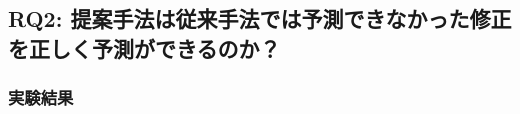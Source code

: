 \documentclass[submit,noauthor,ses,dvipdfmx]{ipsj}
\begin{document}


\subsection{RQ2: 提案手法は従来手法では予測できなかった修正を正しく予測ができるのか？}\label{RQ2}

\subsubsection{実験結果}


\end{document}
